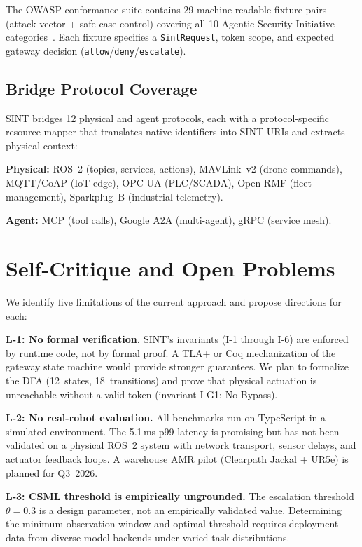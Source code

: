 \documentclass[conference]{IEEEtran}
\begin{document}
The OWASP conformance suite contains 29 machine-readable fixture pairs
(attack vector + safe-case control) covering all 10 Agentic Security
Initiative categories~\cite{owasp-asi}.
Each fixture specifies a \texttt{SintRequest}, token scope, and expected
gateway decision (\texttt{allow}/\texttt{deny}/\texttt{escalate}).

\subsection{Bridge Protocol Coverage}

SINT bridges 12 physical and agent protocols, each with a protocol-specific
resource mapper that translates native identifiers into SINT URIs and extracts
physical context:

\smallskip
\noindent
\textbf{Physical:} ROS~2 (topics, services, actions), MAVLink~v2 (drone
commands), MQTT/CoAP (IoT edge), OPC-UA (PLC/SCADA), Open-RMF (fleet
management), Sparkplug~B (industrial telemetry).

\noindent
\textbf{Agent:} MCP (tool calls), Google A2A (multi-agent), gRPC (service mesh).

\section{Self-Critique and Open Problems}
\label{sec:critique}

We identify five limitations of the current approach and propose directions
for each:

\textbf{L-1: No formal verification.}
SINT's invariants (I-1 through I-6) are enforced by runtime code, not by
formal proof.
A TLA+ or Coq mechanization of the gateway state machine would provide
stronger guarantees.
We plan to formalize the DFA (12~states, 18~transitions) and prove that
physical actuation is unreachable without a valid token (invariant I-G1:
No Bypass).

\textbf{L-2: No real-robot evaluation.}
All benchmarks run on TypeScript in a simulated environment.
The 5.1\,ms p99 latency is promising but has not been validated on a physical
ROS~2 system with network transport, sensor delays, and actuator feedback loops.
A warehouse AMR pilot (Clearpath Jackal + UR5e) is planned for Q3~2026.

\textbf{L-3: CSML threshold is empirically ungrounded.}
The escalation threshold $\theta = 0.3$ is a design parameter, not an
empirically validated value.
Determining the minimum observation window and optimal threshold requires
deployment data from diverse model backends under varied task distributions.
\end{document}
